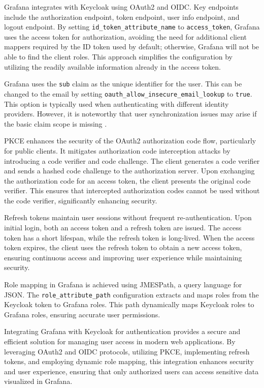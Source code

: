 Grafana integrates with Keycloak using OAuth2 and OIDC. Key endpoints include the authorization endpoint, token endpoint, user info endpoint, and logout endpoint. By setting \texttt{id\_token\_attribute\_name} to \texttt{access\_token}, Grafana uses the access token for authorization, avoiding the need for additional client mappers required by the ID token used by default; otherwise, Grafana will not be able to find the client roles. This approach simplifies the configuration by utilizing the readily available information already in the access token.

Grafana uses the \texttt{sub} claim as the unique identifier for the user. This can be changed to the email by setting \texttt{oauth\_allow\_insecure\_email\_lookup} to \texttt{true}. This option is typically used when authenticating with different identity providers. However, it is noteworthy that user synchronization issues may arise if the basic claim scope is missing \parencite{grafana_authentication}.

PKCE enhances the security of the OAuth2 authorization code flow, particularly for public clients. It mitigates authorization code interception attacks by introducing a code verifier and code challenge. The client generates a code verifier and sends a hashed code challenge to the authorization server. Upon exchanging the authorization code for an access token, the client presents the original code verifier. This ensures that intercepted authorization codes cannot be used without the code verifier, significantly enhancing security.

Refresh tokens maintain user sessions without frequent re-authentication. Upon initial login, both an access token and a refresh token are issued. The access token has a short lifespan, while the refresh token is long-lived. When the access token expires, the client uses the refresh token to obtain a new access token, ensuring continuous access and improving user experience while maintaining security.

Role mapping in Grafana is achieved using JMESPath, a query language for JSON. The \texttt{role\_attribute\_path} configuration extracts and maps roles from the Keycloak token to Grafana roles. This path dynamically maps Keycloak roles to Grafana roles, ensuring accurate user permissions.

Integrating Grafana with Keycloak for authentication provides a secure and efficient solution for managing user access in modern web applications. By leveraging OAuth2 and OIDC protocols, utilizing PKCE, implementing refresh tokens, and employing dynamic role mapping, this integration enhances security and user experience, ensuring that only authorized users can access sensitive data visualized in Grafana.


